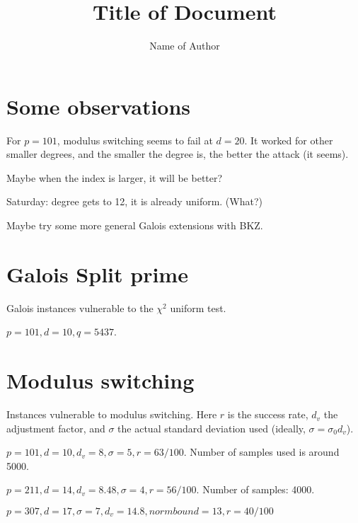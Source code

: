 \documentclass{article}
\title{Title of Document}
\author{Name of Author}
\begin{document}
\maketitle

\section{Some observations}

For $p = 101$, modulus switching seems to fail at $d = 20$. It worked for other smaller degrees, and the smaller the degree is, the better the attack (it seems).

Maybe when the index is larger, it will be better?

Saturday: degree gets to 12, it is already uniform. (What?)

Maybe try some more general Galois extensions with BKZ. 



\section{Galois Split prime}

Galois instances vulnerable to the $\chi^2$ uniform test.


$p = 101, d = 10, q = 5437$.


\section{Modulus switching}

Instances vulnerable to modulus switching. Here
$r$ is the success rate, $d_v$ the adjustment factor, and
$\sigma$ the actual standard deviation used (ideally, $\sigma=  \sigma_0 d_v$).

$p = 101, d = 10, d_v = 8,  \sigma = 5, r = 63/100$.
Number of samples used is around 5000.

$p = 211, d = 14, d_v = 8.48, \sigma =4, r = 56/100$.
Number of samples: 4000.

$p = 307, d= 17, \sigma = 7, d_v = 14.8, norm bound = 13,  r= 40/100$
\end{document}
